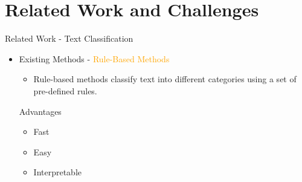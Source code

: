 \documentclass[
 size=14pt,
 paper=smartboard,  %
 mode=present, 		%
 display=slides, 	%
 style=tuliplab,  	%
 pauseslide,
 fleqn,leqno]{powerdot}
\begin{document}
\section{Related Work and Challenges}



\begin{slide}{Related Work - Text Classification}
\begin{itemize}
\item
Existing Methods - \textcolor{orange}{Rule-Based Methods}

\begin{itemize}
\item
Rule-based methods classify text into different categories using a set of pre-defined rules.
\end{itemize}
\vspace{1cm}
{
	\smallskip \smallskip
Advantages
\begin{itemize}
\item
\smallskip
Fast

\item
\smallskip
Easy

\item
\smallskip
Interpretable
\end{itemize}
}
\end{itemize}

\end{slide}
\end{document}
